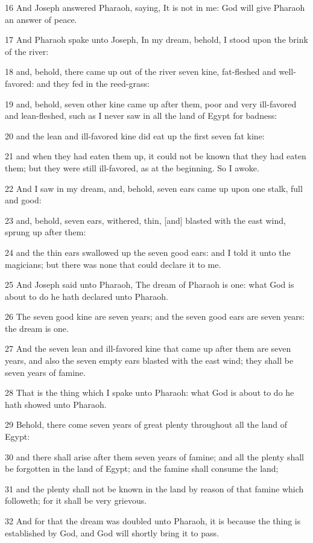 \par 16 And Joseph answered Pharaoh, saying, It is not in me: God will give Pharaoh an answer of peace.
\par 17 And Pharaoh spake unto Joseph, In my dream, behold, I stood upon the brink of the river:
\par 18 and, behold, there came up out of the river seven kine, fat-fleshed and well-favored: and they fed in the reed-grass:
\par 19 and, behold, seven other kine came up after them, poor and very ill-favored and lean-fleshed, such as I never saw in all the land of Egypt for badness:
\par 20 and the lean and ill-favored kine did eat up the first seven fat kine:
\par 21 and when they had eaten them up, it could not be known that they had eaten them; but they were still ill-favored, as at the beginning. So I awoke.
\par 22 And I saw in my dream, and, behold, seven ears came up upon one stalk, full and good:
\par 23 and, behold, seven ears, withered, thin, [and] blasted with the east wind, sprung up after them:
\par 24 and the thin ears swallowed up the seven good ears: and I told it unto the magicians; but there was none that could declare it to me.
\par 25 And Joseph said unto Pharaoh, The dream of Pharaoh is one: what God is about to do he hath declared unto Pharaoh.
\par 26 The seven good kine are seven years; and the seven good ears are seven years: the dream is one.
\par 27 And the seven lean and ill-favored kine that came up after them are seven years, and also the seven empty ears blasted with the east wind; they shall be seven years of famine.
\par 28 That is the thing which I spake unto Pharaoh: what God is about to do he hath showed unto Pharaoh.
\par 29 Behold, there come seven years of great plenty throughout all the land of Egypt:
\par 30 and there shall arise after them seven years of famine; and all the plenty shall be forgotten in the land of Egypt; and the famine shall consume the land;
\par 31 and the plenty shall not be known in the land by reason of that famine which followeth; for it shall be very grievous.
\par 32 And for that the dream was doubled unto Pharaoh, it is because the thing is established by God, and God will shortly bring it to pass.
